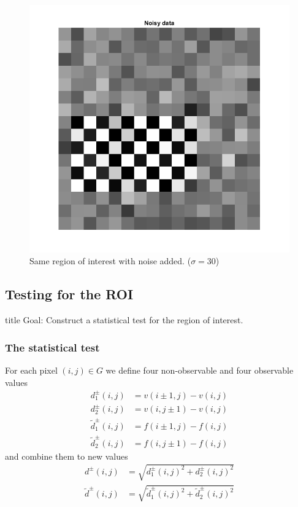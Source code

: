 \documentclass{beamer}
\begin{document}
\begin{frame}
	\begin{figure}
		\includegraphics[width=0.6\linewidth]{Testing/ROI_noisy}
		\caption[Noisy ROI]{Same region of interest with noise added. ($\sigma = 30$)}
		\label{fig:ROI_noisy}
	\end{figure}
\end{frame}

\subsection{Testing for the ROI}

\begin{frame}
	\begin{beamercolorbox}[sep=8pt,center,shadow=true,rounded=true]{title}
		Goal: Construct a statistical test for the region of interest.
	\end{beamercolorbox}
\end{frame}

\subsubsection{The statistical test}

\begin{frame}
	For each pixel $(i, j) \in G$ we define four non-observable and four observable values
	\begin{align*}
		d_1^\pm(i, j) &= v(i \pm 1, j) - v(i, j) \\
		d_2^\pm(i, j) &= v(i, j \pm 1) - v(i, j) \\
		\tilde{d}^\pm_1(i, j) &= f(i \pm 1, j) - f(i, j) \\
		\tilde{d}^\pm_2(i, j) &= f(i, j \pm 1) - f(i, j)
	\end{align*}
	and combine them to new values
	\begin{align*}\label{d}
		d^\pm(i, j) &= \sqrt{d_1^\pm(i, j)^2 + d_2^\pm(i, j)^2} \\
		\tilde{d}^\pm(i, j) &= \sqrt{\tilde{d}_1^\pm(i, j)^2 + \tilde{d}_2^\pm(i, j)^2}
	\end{align*}
\end{frame}
\end{document}
